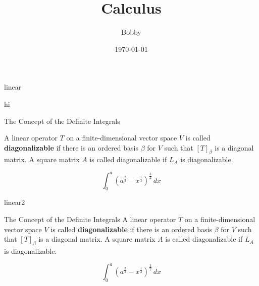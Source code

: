 \documentclass{beamer}
\title{Calculus}
\author{Bobby}
\institute{Tsinghua}
\date{\today}
\begin{document}
\begin{frame}
    \titlepage
\end{frame}



\begin{section}{linear}

    \begin{frame}{hi}

        \begin{block}{The Concept of the Definite Integrals}

            A linear operator $T$ on a finite-dimensional vector space $V$ is called \textbf{diagonalizable} if there is an ordered basis $\beta$ for $V$ such that $[T]_\beta$ is a diagonal matrix.  A square matrix $A$ is called diagonalizable if $L_A$ is diagonalizable.

    $$\int_{0}^{a} \left( a^{\frac{2}{3}} - x^{\frac{1}{3}} \right)^{\frac{3}{2}} \, dx $$

    \end{block}
\end{frame}


\end{section}

\begin{section}{linear2}

    \begin{frame}{The Concept of the Definite Integrals}
    A linear operator $T$ on a finite-dimensional vector space $V$ is called \textbf{diagonalizable} if there is an ordered basis $\beta$ for $V$ such that $[T]_\beta$ is a diagonal matrix.  A square matrix $A$ is called diagonalizable if $L_A$ is diagonalizable.


    $$
	\int_{0}^{a}
	\left(
	a^{\frac{2}{3}} - x^{\frac{1}{3}}
	\right)^{\frac{3}{2}}
	\, dx
	$$


\end{frame}

\end{section}
\end{document}
